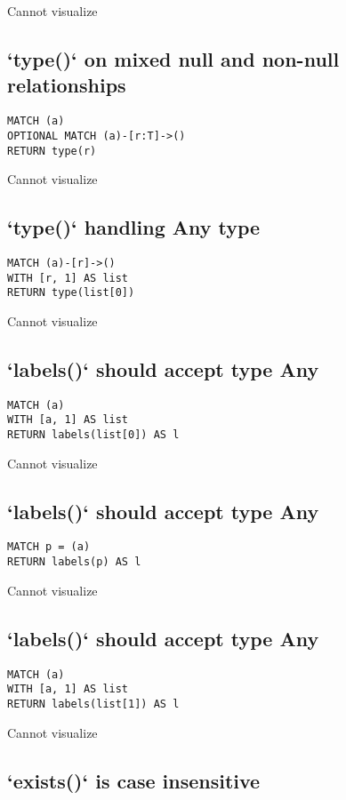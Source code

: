 Cannot visualize
\subsection{`type()` on mixed null and non-null relationships}

\begin{lstlisting}
MATCH (a)
OPTIONAL MATCH (a)-[r:T]->()
RETURN type(r)
\end{lstlisting}

Cannot visualize
\subsection{`type()` handling Any type}

\begin{lstlisting}
MATCH (a)-[r]->()
WITH [r, 1] AS list
RETURN type(list[0])
\end{lstlisting}

Cannot visualize
\subsection{`labels()` should accept type Any}

\begin{lstlisting}
MATCH (a)
WITH [a, 1] AS list
RETURN labels(list[0]) AS l
\end{lstlisting}

Cannot visualize
\subsection{`labels()` should accept type Any}

\begin{lstlisting}
MATCH p = (a)
RETURN labels(p) AS l
\end{lstlisting}

Cannot visualize
\subsection{`labels()` should accept type Any}

\begin{lstlisting}
MATCH (a)
WITH [a, 1] AS list
RETURN labels(list[1]) AS l
\end{lstlisting}

Cannot visualize
\subsection{`exists()` is case insensitive}


